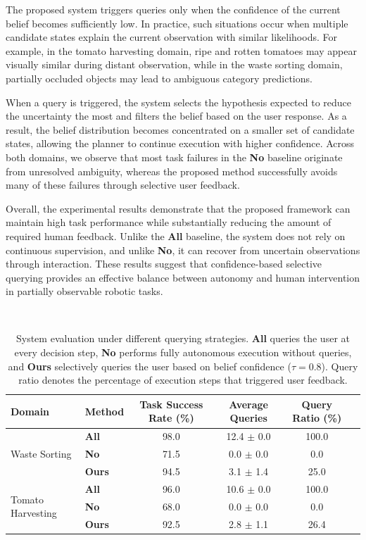 The proposed system triggers queries only when the confidence of the current belief becomes sufficiently low. In practice, such situations occur when multiple candidate states explain the current observation with similar likelihoods. For example, in the tomato harvesting domain, ripe and rotten tomatoes may appear visually similar during distant observation, while in the waste sorting domain, partially occluded objects may lead to ambiguous category predictions.

When a query is triggered, the system selects the hypothesis expected to reduce the uncertainty the most and filters the belief based on the user response. As a result, the belief distribution becomes concentrated on a smaller set of candidate states, allowing the planner to continue execution with higher confidence. Across both domains, we observe that most task failures in the \textbf{No} baseline originate from unresolved ambiguity, whereas the proposed method successfully avoids many of these failures through selective user feedback.




Overall, the experimental results demonstrate that the proposed framework can maintain high task performance while substantially reducing the amount of required human feedback. Unlike the \textbf{All} baseline, the system does not rely on continuous supervision, and unlike \textbf{No}, it can recover from uncertain observations through interaction. These results suggest that confidence-based selective querying provides an effective balance between autonomy and human intervention in partially observable robotic tasks. 



\begin{table}[t]~\label{{tab:system_eval}}
\centering
\caption{System evaluation under different querying strategies. \textbf{All} queries the user at every decision step, \textbf{No} performs fully autonomous execution without queries, and \textbf{Ours} selectively queries the user based on belief confidence ($\tau=0.8$). Query ratio denotes the percentage of execution steps that triggered user feedback.}
\label{tab:system_eval}
\begin{tabular}{llcccc}
\toprule
\textbf{Domain} & \textbf{Method} & \textbf{Task Success Rate (\%)} & \textbf{Average Queries} & \textbf{Query Ratio (\%)} \\
\midrule

\multirow{3}{*}{Waste Sorting}
& \textbf{All}  & 98.0 & 12.4 $\pm$ 0.0 & 100.0 \\
& \textbf{No}   & 71.5 & 0.0 $\pm$ 0.0  & 0.0 \\
& \textbf{Ours} & 94.5 & 3.1 $\pm$ 1.4  & 25.0 \\
\midrule

\multirow{3}{*}{Tomato Harvesting}
& \textbf{All}  & 96.0 & 10.6 $\pm$ 0.0 & 100.0 \\
& \textbf{No}   & 68.0 & 0.0 $\pm$ 0.0  & 0.0 \\
& \textbf{Ours} & 92.5 & 2.8 $\pm$ 1.1  & 26.4 \\
\bottomrule
\end{tabular}
\end{table}
